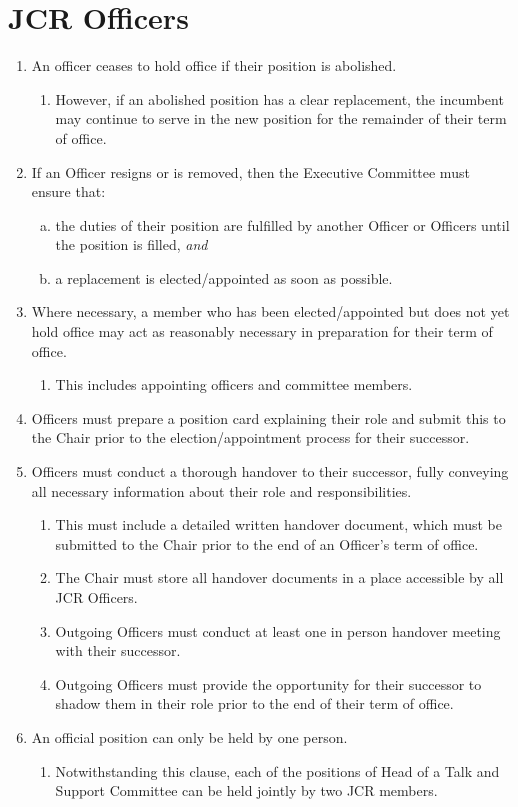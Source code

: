 \documentclass[12pt]{article}
\begin{document}
\section{JCR Officers}
\begin{enumerate}
    \item An officer ceases to hold office if their position is abolished.
    \begin{enumerate}
            \item However, if an abolished position has a clear replacement, the incumbent may continue to serve in the new position for the remainder of their term of office.
    \end{enumerate}
    \item If an Officer resigns or is removed, then the Executive Committee must ensure that:
    \begin{enumerate}[(a)]
        \item the duties of their position are fulfilled by another Officer or Officers until the position is filled, \emph{and}
        \item a replacement is elected/appointed as soon as possible.
    \end{enumerate}
    \item\label{preterm-prep} Where necessary, a member who has been elected/appointed but does not yet hold office may act as reasonably necessary in preparation for their term of office.
    \begin{enumerate}
        \item This includes appointing officers and committee members.
    \end{enumerate}
    \item Officers must prepare a position card explaining their role and submit this to the Chair prior to the election/appointment process for their successor.
    \item Officers must conduct a thorough handover to their successor, fully conveying all necessary information about their role and responsibilities.
    \begin{enumerate}
        \item This must include a detailed written handover document, which must be submitted to the Chair prior to the end of an Officer’s term of office.
        \item  The Chair must store all handover documents in a place accessible by all JCR Officers.
        \item Outgoing Officers must conduct at least one in person handover meeting with their successor.
        \item  Outgoing Officers must provide the opportunity for their successor to shadow them in their role prior to the end of their term of office.
    \end{enumerate}
    \item An official position can only be held by one person.
    \begin{enumerate}
        \item Notwithstanding this clause, each of the positions of Head of a Talk and Support Committee can be held jointly by two JCR members.
    \end{enumerate}
\end{enumerate}
\end{document}
